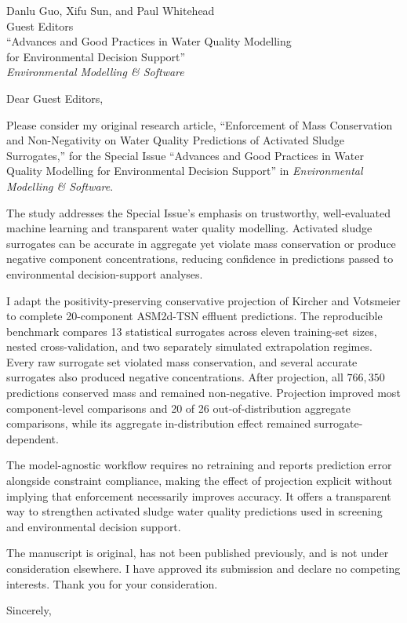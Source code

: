 \documentclass[11pt]{letter}
\date{\today}
\begin{document}
\begin{letter}{Danlu Guo, Xifu Sun, and Paul Whitehead\\
Guest Editors\\
``Advances and Good Practices in Water Quality Modelling\\
for Environmental Decision Support''\\
\textit{Environmental Modelling \& Software}}

\opening{Dear Guest Editors,}

Please consider my original research article, ``Enforcement of Mass Conservation and Non-Negativity on Water Quality Predictions of Activated Sludge Surrogates,'' for the Special Issue ``Advances and Good Practices in Water Quality Modelling for Environmental Decision Support'' in \textit{Environmental Modelling \& Software}.

The study addresses the Special Issue's emphasis on trustworthy, well-evaluated machine learning and transparent water quality modelling. Activated sludge surrogates can be accurate in aggregate yet violate mass conservation or produce negative component concentrations, reducing confidence in predictions passed to environmental decision-support analyses.

I adapt the positivity-preserving conservative projection of Kircher and Votsmeier to complete 20-component ASM2d-TSN effluent predictions. The reproducible benchmark compares 13 statistical surrogates across eleven training-set sizes, nested cross-validation, and two separately simulated extrapolation regimes. Every raw surrogate set violated mass conservation, and several accurate surrogates also produced negative concentrations. After projection, all $766{,}350$ predictions conserved mass and remained non-negative. Projection improved most component-level comparisons and 20 of 26 out-of-distribution aggregate comparisons, while its aggregate in-distribution effect remained surrogate-dependent.

The model-agnostic workflow requires no retraining and reports prediction error alongside constraint compliance, making the effect of projection explicit without implying that enforcement necessarily improves accuracy. It offers a transparent way to strengthen activated sludge water quality predictions used in screening and environmental decision support.

The manuscript is original, has not been published previously, and is not under consideration elsewhere. I have approved its submission and declare no competing interests. Thank you for your consideration.

\closing{Sincerely,}

\end{letter}
\end{document}
